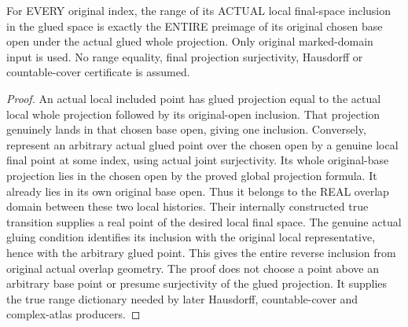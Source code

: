 \begin{theorem}
\label{hir:original-input-terminal-glued-local-range-whole-open-preimage}
\leanok
For EVERY original index, the range of its ACTUAL local final-space
inclusion in the glued space is exactly the ENTIRE preimage of its
original chosen base open under the actual glued whole projection.
Only original marked-domain input is used. No range equality, final
projection surjectivity, Hausdorff or countable-cover certificate is assumed.
\end{theorem}
\begin{proof}
An actual local included point has glued projection equal to the actual
local whole projection followed by its original-open inclusion. That
projection genuinely lands in that chosen base open, giving one inclusion.
Conversely, represent an arbitrary actual glued point over the chosen
open by a genuine local final point at some index, using actual joint
surjectivity. Its whole original-base projection lies in the chosen open
by the proved global projection formula. It already lies in its own
original base open. Thus it belongs to the REAL overlap domain between
these two local histories. Their internally constructed true transition
supplies a real point of the desired local final space. The genuine
actual gluing condition identifies its inclusion with the original local
representative, hence with the arbitrary glued point. This gives the
entire reverse inclusion from original actual overlap geometry. The
proof does not choose a point above an arbitrary base point or presume
surjectivity of the glued projection. It supplies the true range dictionary
needed by later Hausdorff, countable-cover and complex-atlas producers.
\end{proof}
